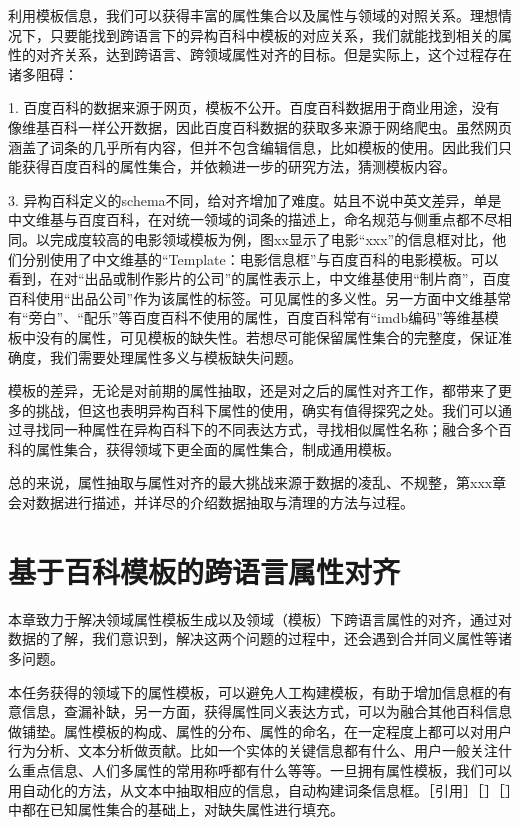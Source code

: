 利用模板信息，我们可以获得丰富的属性集合以及属性与领域的对照关系。理想情况下，只要能找到跨语言下的异构百科中模板的对应关系，我们就能找到相关的属性的对齐关系，达到跨语言、跨领域属性对齐的目标。但是实际上，这个过程存在诸多阻碍：

1.  百度百科的数据来源于网页，模板不公开。百度百科数据用于商业用途，没有像维基百科一样公开数据，因此百度百科数据的获取多来源于网络爬虫。虽然网页涵盖了词条的几乎所有内容，但并不包含编辑信息，比如模板的使用。因此我们只能获得百度百科的属性集合，并依赖进一步的研究方法，猜测模板内容。

3.  异构百科定义的schema不同，给对齐增加了难度。姑且不说中英文差异，单是中文维基与百度百科，在对统一领域的词条的描述上，命名规范与侧重点都不尽相同。以完成度较高的电影领域模板为例，图xx显示了电影“xxx”的信息框对比，他们分别使用了中文维基的“Template：电影信息框”与百度百科的电影模板。可以看到，在对“出品或制作影片的公司”的属性表示上，中文维基使用“制片商”，百度百科使用“出品公司”作为该属性的标签。可见属性的多义性。另一方面中文维基常有“旁白”、“配乐”等百度百科不使用的属性，百度百科常有“imdb编码”等维基模板中没有的属性，可见模板的缺失性。若想尽可能保留属性集合的完整度，保证准确度，我们需要处理属性多义与模板缺失问题。

模板的差异，无论是对前期的属性抽取，还是对之后的属性对齐工作，都带来了更多的挑战，但这也表明异构百科下属性的使用，确实有值得探究之处。我们可以通过寻找同一种属性在异构百科下的不同表达方式，寻找相似属性名称；融合多个百科的属性集合，获得领域下更全面的属性集合，制成通用模板。

总的来说，属性抽取与属性对齐的最大挑战来源于数据的凌乱、不规整，第xxx章会对数据进行描述，并详尽的介绍数据抽取与清理的方法与过程。

\section{基于百科模板的跨语言属性对齐}
\label{sec:property-matching}

本章致力于解决领域属性模板生成以及领域（模板）下跨语言属性的对齐，通过对数据的了解，我们意识到，解决这两个问题的过程中，还会遇到合并同义属性等诸多问题。

本任务获得的领域下的属性模板，可以避免人工构建模板，有助于增加信息框的有意信息，查漏补缺，另一方面，获得属性同义表达方式，可以为融合其他百科信息做铺垫。属性模板的构成、属性的分布、属性的命名，在一定程度上都可以对用户行为分析、文本分析做贡献。比如一个实体的关键信息都有什么、用户一般关注什么重点信息、人们多属性的常用称呼都有什么等等。一旦拥有属性模板，我们可以用自动化的方法，从文本中抽取相应的信息，自动构建词条信息框。［引用］［］［］中都在已知属性集合的基础上，对缺失属性进行填充。


